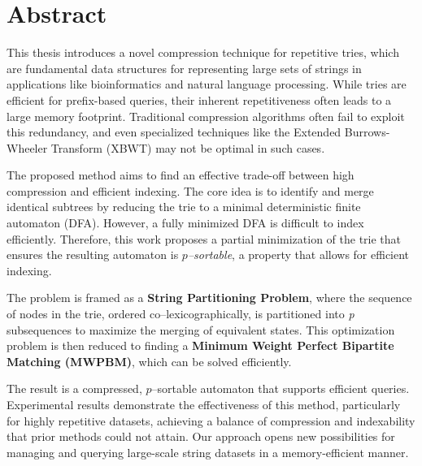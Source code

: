 \chapter*{Abstract}

This thesis introduces a novel compression technique for repetitive tries, which are fundamental data structures for representing large sets of strings in applications like bioinformatics and natural language processing. While tries are efficient for prefix-based queries, their inherent repetitiveness often leads to a large memory footprint. Traditional compression algorithms often fail to exploit this redundancy, and even specialized techniques like the Extended Burrows-Wheeler Transform (XBWT) may not be optimal in such cases.

The proposed method aims to find an effective trade-off between high compression and efficient indexing. The core idea is to identify and merge identical subtrees by reducing the trie to a minimal deterministic finite automaton (DFA). However, a fully minimized DFA is difficult to index efficiently. Therefore, this work proposes a partial minimization of the trie that ensures the resulting automaton is \textit{$p$--sortable}, a property that allows for efficient indexing.

The problem is framed as a \textbf{String Partitioning Problem}, where the sequence of nodes in the trie, ordered co--lexicographically, is partitioned into \textit{p} subsequences to maximize the merging of equivalent states. This optimization problem is then reduced to finding a \textbf{Minimum Weight Perfect Bipartite Matching (MWPBM)}, which can be solved efficiently.

The result is a compressed, $p$--sortable automaton that supports efficient queries. Experimental results demonstrate the effectiveness of this method, particularly for highly repetitive datasets, achieving a balance of compression and indexability that prior methods could not attain. Our approach opens new possibilities for managing and querying large-scale string datasets in a memory-efficient manner.